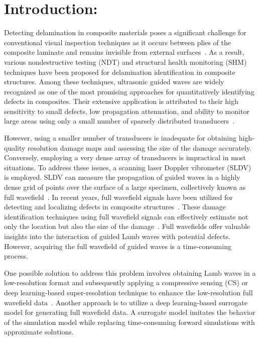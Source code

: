 \section{Introduction:}

Detecting delamination in composite materials poses a significant challenge for 
conventional visual inspection techniques as it occurs between plies of the 
composite laminate and remains invisible from external 
surfaces~\cite{staszewski2009health, tuo2019damage}. As a result, various 
nondestructive testing (NDT) and structural health monitoring (SHM) techniques 
have been proposed for delamination identification in composite structures. 
Among these techniques, ultrasonic guided waves are widely recognized as one of 
the most promising approaches for quantitatively identifying defects in 
composites. Their extensive application is attributed to their high sensitivity 
to small defects, low propagation attenuation, and ability to monitor large 
areas using only a small number of sparsely distributed 
transducers~\cite{Barthorpe2020, Ihn2008, Cantero-Chinchilla2020}.

However, using a smaller number of transducers is inadequate for obtaining 
high-quality resolution damage maps and assessing the size of the damage 
accurately. Conversely, employing a very dense array of transducers is 
impractical in most situations. To address these issues, a scanning laser 
Doppler vibrometer (SLDV) is employed. SLDV can measure the propagation of 
guided waves in a highly dense grid of points over the surface of a large 
specimen, collectively known as full wavefield~\cite{Radzienski2019a}. In 
recent years, full wavefield signals have been utilized for detecting and 
localizing defects in composite structures~\cite{Radzienski2019a, 
	Girolamo2018a, kudela2018impact, rogge2013characterization}. These damage 
identification techniques using full wavefield signals can effectively estimate 
not only the location but also the size of the damage~\cite{Girolamo2018a, 
	kudela2018impact}. Full wavefields offer valuable insights into the 
	interaction 
of guided Lamb waves with potential defects. However, acquiring the full 
wavefield of guided waves is a time-consuming process.


One possible solution to address this problem involves obtaining Lamb waves in 
a low-resolution format and subsequently applying a compressive sensing (CS) or 
deep learning-based super-resolution technique to enhance the low-resolution 
full wavefield data~\cite{ijjeh2023deep}. Another approach is to utilize a deep 
learning-based surrogate model for generating full wavefield data. A surrogate 
model imitates the behavior of the simulation model while replacing 
time-consuming forward simulations with approximate solutions.

